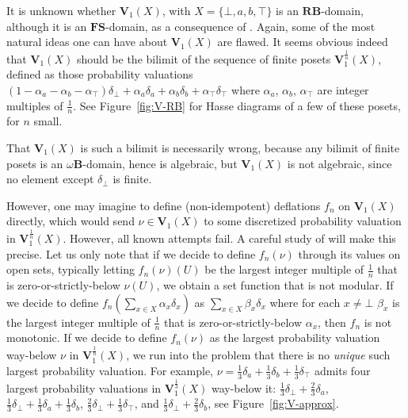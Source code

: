 \documentclass{LMCS}
\newcommand\B{\mathbf{B}}
\newcommand\RB{\mathbf{RB}}
\newcommand\FS{\mathbf{FS}}
\newcommand\Val{\mathbf V}
\begin{document}
It is unknown whether $\Val_1 (X)$, with $X = \{\bot, a, b, \top\}$ is
an $\RB$-domain, although it is an $\FS$-domain, as a consequence of
\cite[Theorem~17]{JT:troublesome}.  Again, some of the most natural
ideas one can have about $\Val_1 (X)$ are flawed.  It seems obvious
indeed that $\Val_1 (X)$ should be the bilimit of the sequence of
finite posets $\Val_1^{\frac 1 n} (X)$, defined as those probability
valuations $(1 - \alpha_a - \alpha_b - \alpha_\top) \delta_\bot +
\alpha_a \delta_a + \alpha_b \delta_b + \alpha_\top \delta_\top$ where
$\alpha_a$, $\alpha_b$, $\alpha_\top$ are integer multiples of $\frac
1 n$.  See Figure~\ref{fig:V-RB} for Hasse diagrams of a few of these
posets, for $n$ small.

That $\Val_1 (X)$ is such a bilimit is necessarily wrong, because any
bilimit of finite posets is an $\omega\B$-domain, hence is algebraic,
but $\Val_1 (X)$ is not algebraic, since no element except
$\delta_\bot$ is finite.

However, one may imagine to define (non-idempotent) deflations $f_n$
on $\Val_1 (X)$ directly, which would send $\nu \in \Val_1 (X)$ to
some discretized probability valuation in $\Val_1^{\frac 1 n} (X)$.
However, all known attempts fail.  A careful study of
\cite{JT:troublesome} will make this precise.  Let us only note that
if we decide to define $f_n (\nu)$ through its values on open sets,
typically letting $f_n (\nu) (U)$ be the largest integer multiple of
$\frac 1 n$ that is zero-or-strictly-below $\nu (U)$, we obtain a set
function that is not modular.  If we decide to define $f_n (\sum_{x
  \in X} \alpha_x \delta_x)$ as $\sum_{x \in X} \beta_x \delta_x$
where for each $x \neq \bot$ $\beta_x$ is the largest integer multiple
of $\frac 1 n$ that is zero-or-strictly-below $\alpha_x$, then $f_n$
is not monotonic.  If we decide to define $f_n (\nu)$ as the largest
probability valuation way-below $\nu$ in $\Val_1^{\frac 1 n} (X)$, we
run into the problem that there is no {\em unique\/} such largest
probability valuation.  For example, $\nu = \frac 1 3 \delta_a + \frac
1 3 \delta_b + \frac 1 3 \delta_\top$ admits four largest probability
valuations in $\Val_1^{\frac 1 3} (X)$ way-below it: $\frac 1 3
\delta_\bot + \frac 2 3 \delta_a$, $\frac 1 3 \delta_\bot + \frac 1 3
\delta_a + \frac 1 3 \delta_b$, $\frac 2 3 \delta_\bot + \frac 1 3
\delta_\top$, and $\frac 1 3 \delta_\bot + \frac 2 3 \delta_b$, see
Figure~\ref{fig:V-approx}.
\end{document}
